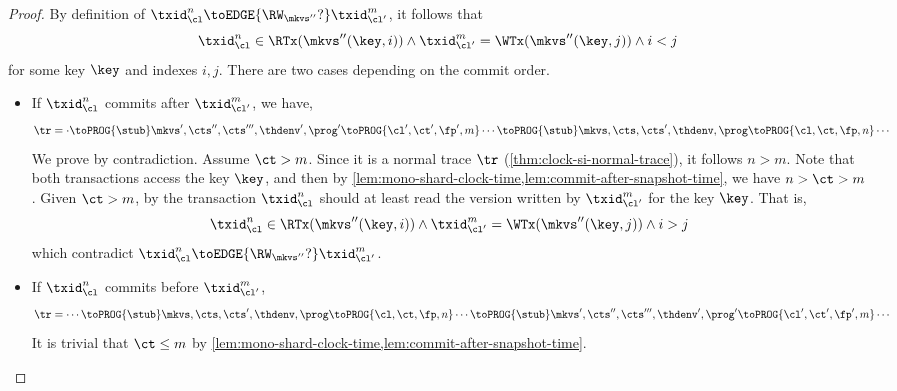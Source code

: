 \begin{proof}
    By definition of \( \txid_\cl^n \toEDGE{\RW_{\mkvs''}?} \txid_{\cl'}^m \),
    it follows that
    \[
        \txid_\cl^n \in \RTx(\mkvs''(\key,i)) 
        \land \txid_{\cl'}^m = \WTx(\mkvs''(\key,j)) 
        \land i < j
    \]                              
    for some key \( \key \) and indexes \( i,j \).
    There are two cases depending on the commit order.
    \begin{itemize}
        \item If \( \txid_\cl^n \) commits after \( \txid_{\cl'}^m  \),
            we have,
            \[
                \begin{array}{@{}l@{}}
                \tr = \cdot \toPROG{\stub} \mkvs',\cts'',\cts''',\thdenv', \prog' \toPROG{\cl',\ct',\fp',m} \cdots
                \toPROG{\stub} \mkvs,\cts,\cts',\thdenv, \prog \toPROG{\cl,\ct,\fp,n} \cdots \\
                \end{array}
            \]
            We prove by contradiction.
            Assume \( \ct > m \).
            Since it is a normal trace \( \tr \) (\cref{thm:clock-si-normal-trace}), 
            it follows \( n > m \).
            Note that both transactions access the key \( \key \), and then by \cref{lem:mono-shard-clock-time,lem:commit-after-snapshot-time}, we have \( n > \ct > m  \).
            Given \( \ct > m \), by  the transaction \( \txid_\cl^n \) should at least read the version written by \( \txid_{\cl'}^m \) for the key \( \key \).
            That is,
            \[
                \txid_\cl^n \in \RTx(\mkvs''(\key,i)) 
                \land \txid_{\cl'}^m = \WTx(\mkvs''(\key,j)) 
                \land i > j
            \]
            which contradict  \( \txid_\cl^n \toEDGE{\RW_{\mkvs''}?} \txid_{\cl'}^m  \).
        \item If \( \txid_\cl^n \) commits before \( \txid_{\cl'}^m  \),
            \[
                \begin{array}{@{}l@{}}
                    \tr = \cdots \toPROG{\stub} \mkvs,\cts,\cts',\thdenv, \prog \toPROG{\cl,\ct,\fp,n} \cdots
                    \toPROG{\stub} \mkvs',\cts'',\cts''',\thdenv', \prog' \toPROG{\cl',\ct',\fp',m} \cdots
                \end{array}
            \]
            It is trivial that \( \ct \leq m \) by \cref{lem:mono-shard-clock-time,lem:commit-after-snapshot-time}.
    \end{itemize}
\end{proof}

